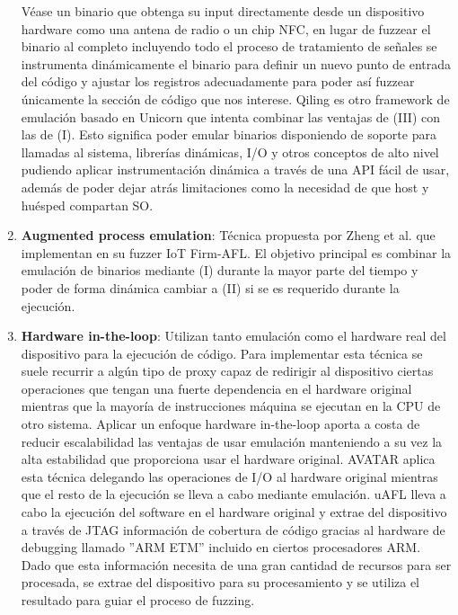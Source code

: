 \begin{enumerate}[I]
    Véase un binario que obtenga su 
    input directamente desde un dispositivo hardware como una antena de radio o un chip NFC, en lugar de fuzzear el binario al completo incluyendo todo el 
    proceso de tratamiento de señales se instrumenta dinámicamente el binario para definir un nuevo punto de entrada del código y ajustar los registros
    adecuadamente para poder así fuzzear únicamente la sección de código que nos interese. Qiling\cite{qiling} es otro framework de emulación basado en
    Unicorn\cite{unicorn} que intenta combinar las ventajas de (III) con las de (I). Esto significa poder emular binarios disponiendo de soporte 
    para llamadas al sistema, librerías dinámicas, I/O y otros conceptos de alto nivel pudiendo aplicar instrumentación dinámica a través de una API fácil 
    de usar, además de poder dejar atrás limitaciones como la necesidad de que host y huésped compartan SO.
    \item \textbf{Augmented process emulation}: Técnica propuesta por Zheng et al.\cite{Zheng2019} que implementan en su fuzzer IoT Firm-AFL. El objetivo 
    principal es combinar la emulación de binarios mediante (I) durante la mayor parte del tiempo y poder de forma dinámica cambiar a (II) si se es 
    requerido durante la ejecución.
    \item \textbf{Hardware in-the-loop}: Utilizan tanto emulación como el hardware real del dispositivo para la ejecución de código. Para implementar esta 
    técnica se suele recurrir a algún tipo de proxy capaz de redirigir al dispositivo ciertas operaciones que tengan una fuerte dependencia en el hardware
    original mientras que la mayoría de instrucciones máquina se ejecutan en la CPU de otro sistema. Aplicar un enfoque hardware in-the-loop aporta a costa 
    de reducir escalabilidad las ventajas de usar emulación manteniendo a su vez la alta estabilidad que proporciona usar el hardware original.
    AVATAR\cite{Zaddach2014} aplica esta técnica delegando las operaciones de I/O al hardware original mientras que el resto de la ejecución se lleva a 
    cabo mediante emulación. uAFL\cite{uAFL} lleva a cabo la ejecución del software en el hardware original y extrae del dispositivo a través de JTAG
    información de cobertura de código gracias al hardware de debugging llamado ''ARM ETM'' incluido en ciertos procesadores ARM. Dado que 
    esta información necesita de una gran cantidad de recursos para ser procesada, se extrae del dispositivo para su procesamiento y se utiliza el resultado
    para guiar el proceso de fuzzing.
\end{enumerate}

